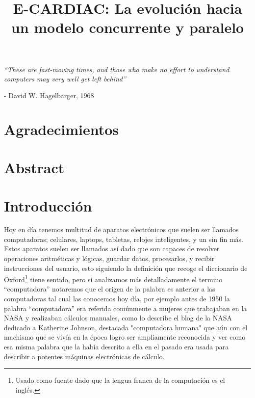 \documentclass[letterpaper,12pt,oneside]{book}
\title{E-CARDIAC: La evolución hacia un modelo concurrente y paralelo}
\begin{document}
	\frontmatter
	\pagestyle{plain} %

    

\chapter*{}
\begin{flushright}%
  \emph{``These are fast-moving times, and those who make no effort to understand computers may very well get left behind''}
  
  
  - David W. Hagelbarger, 1968
\end{flushright}

\chapter*{Agradecimientos}

\chapter*{Abstract}

\chapter{Introducción}

	Hoy en día tenemos multitud de aparatos electrónicos que suelen ser llamados computadoras; celulares, laptops, tabletas, relojes inteligentes, y un sin fin más. 
	Estos aparatos suelen ser llamados así dado que son capaces de resolver operaciones aritméticas y lógicas, guardar datos, procesarlos, y recibir instrucciones del 
	usuario, esto siguiendo la definición
	que recoge el diccionario de Oxford\footnote{Usado como fuente dado que la lengua franca de la computación es el inglés.} tiene sentido,
	pero si analizamos más detalladamente el termino ``computadora''  notaremos que el origen de la palabra es anterior a las computadoras
	tal cual las conocemos hoy día, por ejemplo antes de 1950 la palabra ``computadora''  era referida comúnmente a mujeres
	que trabajaban en la NASA y realizaban cálculos manuales, como lo describe el blog \cite{nasa_who_2020} de la NASA dedicado a Katherine Johnson, destacada "computadora humana" que aún con el machismo que se vivía en la época logro ser ampliamente reconocida y ver como esa misma palabra que la había descrito a ella en el pasado
	era usada para describir a potentes máquinas electrónicas de cálculo.
\end{document}
